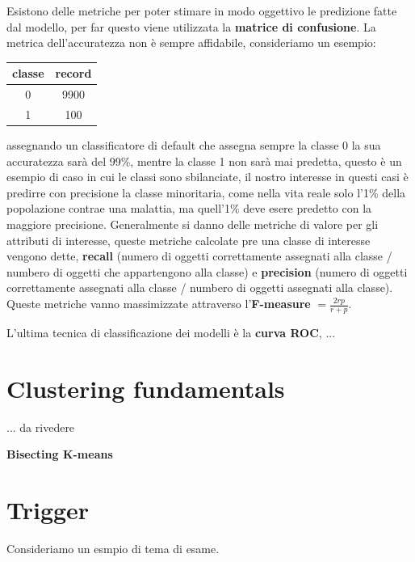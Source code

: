 \documentclass[12pt]{article}
\begin{document}
Esistono delle metriche per poter stimare in modo oggettivo le predizione fatte dal modello, per far questo viene utilizzata la \textbf{matrice di confusione}.
La metrica  dell'accuratezza non \`e sempre affidabile, consideriamo un esempio: 
\begin{table}[H]
    \centering
    \begin{tabular}{|c|c|}
        \hline
        classe & record \\
        \hline
        0 & 9900 \\
        1 & 100 \\
        \hline
    \end{tabular}
\end{table}
assegnando un classificatore di default che assegna sempre la classe 0 la sua accuratezza sar\`a del 99\%, mentre la classe 1 non sar\`a mai predetta, questo \`e un esempio di caso in cui le classi sono sbilanciate, il nostro interesse in questi casi \`e predirre con precisione la classe minoritaria, come nella vita reale solo l'1\% della popolazione contrae una malattia, ma quell'1\% deve esere predetto con la maggiore precisione. Generalmente si danno delle metriche di valore per gli attributi di interesse, queste metriche calcolate pre una classe di interesse vengono dette, \textbf{recall} (numero di oggetti correttamente assegnati alla classe / numbero di oggetti che appartengono alla classe) e \textbf{precision} (numero di oggetti correttamente assegnati alla classe / numbero di oggetti assegnati alla classe). Queste metriche vanno massimizzate attraverso l'\textbf{F-measure} $= \frac{2rp}{r + p} $.

L'ultima tecnica di classificazione dei modelli \`e la \textbf{curva ROC}, ...



\section{Clustering fundamentals}
... da rivedere


\textbf{Bisecting K-means}









\newpage
\section{Trigger}
Consideriamo un esmpio di tema di esame.
\end{document}
